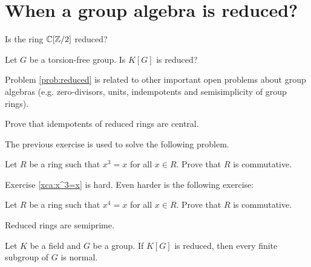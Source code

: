 \section{When a group algebra is reduced?}
\label{section:reduced}

\begin{exercise}
    Is the ring $\mathbb{C}[\mathbb{Z}/2]$ reduced? 
\end{exercise}


\begin{problem}
\label{prob:reduced}
    Let $G$ be a torsion-free group. Is
    $K[G]$ is reduced?
\end{problem}

Problem \ref{prob:reduced} is related to other important
open problems about group algebras 
(e.g. zero-divisors, units, 
indempotents and semisimplicity of group
rings).

\begin{exercise}
\label{xca:reduced_central}
    Prove that idempotents of reduced rings are central. 
\end{exercise}

The previous exercise is used to solve the following problem.

\begin{exercise}
\label{xca:x^3=x}
    Let $R$ be a ring such that $x^3=x$ for all $x\in R$. Prove that
    $R$ is commutative. 
\end{exercise}

Exercise \ref{xca:x^3=x} is hard. 
Even harder is the following exercise:

\begin{exercise}
\label{xca:x^4=x}
    Let $R$ be a ring such that $x^4=x$ for all $x\in R$. Prove
    that $R$ is commutative. 
\end{exercise}



\begin{exercise}
\label{xca:reduced=>semiprime}
    Reduced rings are semiprime.
\end{exercise}
 
\begin{theorem}
\label{thm:reduced}
    Let $K$ be a field and $G$ be a group. If $K[G]$
    is reduced, then every finite subgroup of $G$ is normal. 
\end{theorem}

